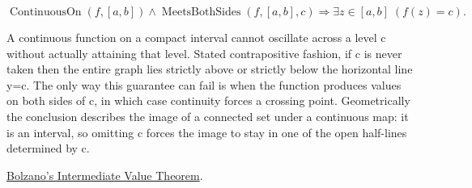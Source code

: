 \begin{remark*}
\[
\operatorname{ContinuousOn}(f,[a,b])
\land
\operatorname{MeetsBothSides}(f,[a,b],c)
\Longrightarrow
\exists z\in[a,b]\;(f(z)=c).
\]
\end{remark*}

\begin{remark*}[Interpretation]
A continuous function on a compact interval cannot oscillate across a level c without actually attaining that level. Stated contrapositive fashion, if c is never taken then the entire graph lies strictly above or strictly below the horizontal line y=c. The only way this guarantee can fail is when the function produces values on both sides of c, in which case continuity forces a crossing point. Geometrically the conclusion describes the image of a connected set under a continuous map: it is an interval, so omitting c forces the image to stay in one of the open half-lines determined by c.
\end{remark*}

\begin{remark*}[Dependencies]
\hyperref[thm:bolzano-intermediate-value]{Bolzano's Intermediate Value Theorem}.
\end{remark*}
